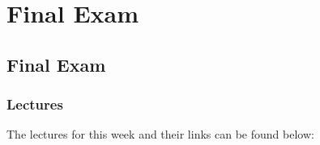 \clearpage

\renewcommand{\ChapTitle}{Final Exam}
\renewcommand{\SectionTitle}{Final Exam}

\chapter{\ChapTitle}
\section{\SectionTitle}

\subsection{Lectures}

The lectures for this week and their links can be found below:


